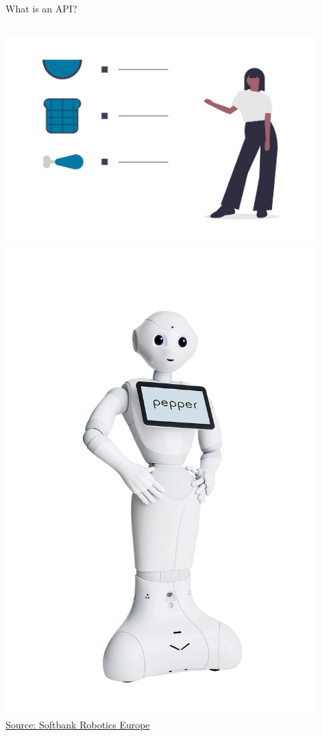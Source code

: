 \documentclass[xcolor=x11names, aspectratio=169, compress]{beamer}
\renewcommand{\(}{\begin{columns}}
\renewcommand{\)}{\end{columns}}
\newcommand{\<}[1]{\begin{column}{#1}}
\renewcommand{\>}{\end{column}}
\begin{document}
\begin{frame}{What is an API?}
\begin{columns}[T]
    \begin{column}{0.3\textwidth}
    \begin{center}
      \includegraphics[width=0.9\textwidth]{undraw_diet_ghvw.png} \\
      \includegraphics[width=0.9\textwidth]{Pepper_the_Robot.jpg} \\
      \textcolor{gris}{\tiny \href{https://commons.wikimedia.org/wiki/File:Pepper_the_Robot.jpg}{Source: Softbank Robotics Europe}}
    \end{center}
    \end{column}
\end{columns}
\end{frame}
\end{document}
